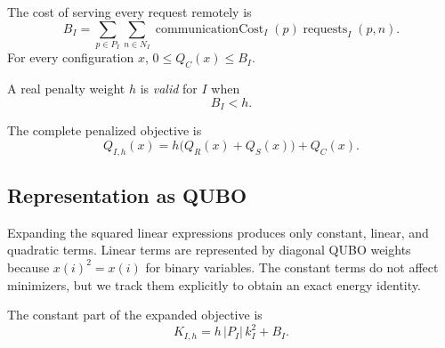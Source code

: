 \begin{definition}\label{def:remote-cost-bound}
The cost of serving every request remotely is
\[
  B_I=\sum_{p\in P_I}\sum_{n\in N_I}
    \operatorname{communicationCost}_I(p)
    \operatorname{requests}_I(p,n).
\]
For every configuration $x$, $0\leq Q_C(x)\leq B_I$.
\end{definition}

\begin{definition}\label{def:valid-penalty-weight}
A real penalty weight $h$ is \emph{valid} for $I$ when
\[
  B_I<h.
\]
\end{definition}

\begin{definition}\label{def:allocation-objective}
The complete penalized objective is
\[
  Q_{I,h}(x)=h\bigl(Q_R(x)+Q_S(x)\bigr)+Q_C(x).
\]
\end{definition}

\subsection{Representation as QUBO}

Expanding the squared linear expressions produces only constant, linear, and
quadratic terms. Linear terms are represented by diagonal QUBO weights because
$x(i)^2=x(i)$ for binary variables. The constant terms do not affect minimizers,
but we track them explicitly to obtain an exact energy identity.

\begin{definition}\label{def:objective-offset}
The constant part of the expanded objective is
\[
  K_{I,h}=h\,|P_I|\,k_I^2+B_I.
\]
\end{definition}

